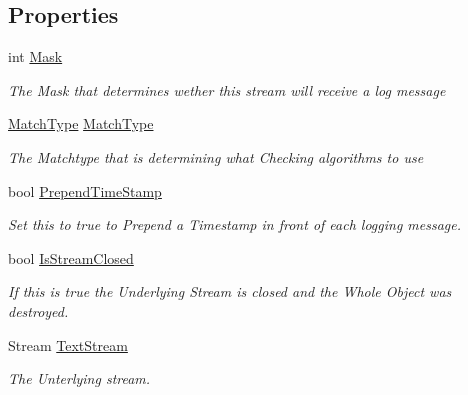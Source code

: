 \subsection*{Properties}
\begin{DoxyCompactItemize}
\item 
int \mbox{\hyperlink{class_a_d_l_1_1_log_stream_af23693ee745713d880e582484abdcee4}{Mask}}
\begin{DoxyCompactList}\small\item\em The Mask that determines wether this stream will receive a log message \end{DoxyCompactList}\item 
\mbox{\hyperlink{namespace_a_d_l_af6334296dbae0383a652317263f0bc05}{Match\+Type}} \mbox{\hyperlink{class_a_d_l_1_1_log_stream_a25e7b0c79959a4c51d2bcfa072d1737e}{Match\+Type}}
\begin{DoxyCompactList}\small\item\em The Matchtype that is determining what Checking algorithms to use \end{DoxyCompactList}\item 
bool \mbox{\hyperlink{class_a_d_l_1_1_log_stream_a9d77af7e36ed281e83c500dfd28edfcd}{Prepend\+Time\+Stamp}}
\begin{DoxyCompactList}\small\item\em Set this to true to Prepend a Timestamp in front of each logging message. \end{DoxyCompactList}\item 
bool \mbox{\hyperlink{class_a_d_l_1_1_log_stream_aafc38c086b8e9211cfc46cf1f86dd18f}{Is\+Stream\+Closed}}
\begin{DoxyCompactList}\small\item\em If this is true the Underlying Stream is closed and the Whole Object was destroyed. \end{DoxyCompactList}\item 
Stream \mbox{\hyperlink{class_a_d_l_1_1_log_stream_a65680991404e699fcafd4bc729504fc3}{Text\+Stream}}
\begin{DoxyCompactList}\small\item\em The Unterlying stream. \end{DoxyCompactList}\end{DoxyCompactItemize}
